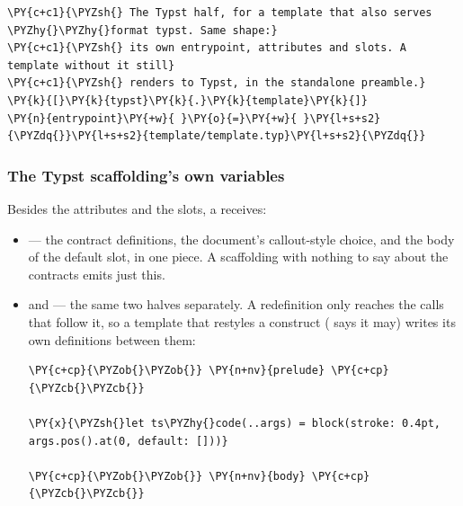 \documentclass[a4paper,twoside]{article}
\begin{document}
\begin{tscode}[lang=toml, engine=pygments]
\begin{Verbatim}[commandchars=\\\{\},breaklines, breakanywhere, commandchars=\\\{\}]
\PY{c+c1}{\PYZsh{} The Typst half, for a template that also serves \PYZhy{}\PYZhy{}format typst. Same shape:}
\PY{c+c1}{\PYZsh{} its own entrypoint, attributes and slots. A template without it still}
\PY{c+c1}{\PYZsh{} renders to Typst, in the standalone preamble.}
\PY{k}{[}\PY{k}{typst}\PY{k}{.}\PY{k}{template}\PY{k}{]}
\PY{n}{entrypoint}\PY{+w}{ }\PY{o}{=}\PY{+w}{ }\PY{l+s+s2}{\PYZdq{}}\PY{l+s+s2}{template/template.typ}\PY{l+s+s2}{\PYZdq{}}
\end{Verbatim}
\end{tscode}
\subsubsection{The Typst scaffolding's own variables}
Besides the attributes and the slots, a  receives:
\begin{itemize}
\item {} --- the  contract definitions, the document's
callout-style choice, and the body of the default slot, in one piece. A
scaffolding with nothing to say about the contracts emits just this.
\item {} and  --- the same two halves separately. A 
redefinition only reaches the calls that follow it, so a template that
restyles a construct ( says it may) writes its own definitions
between them:
\begin{tscode}[lang=jinja, engine=pygments]
\begin{Verbatim}[commandchars=\\\{\},breaklines, breakanywhere, commandchars=\\\{\}]
\PY{c+cp}{\PYZob{}\PYZob{}} \PY{n+nv}{prelude} \PY{c+cp}{\PYZcb{}\PYZcb{}}

\PY{x}{\PYZsh{}let ts\PYZhy{}code(..args) = block(stroke: 0.4pt, args.pos().at(0, default: []))}

\PY{c+cp}{\PYZob{}\PYZob{}} \PY{n+nv}{body} \PY{c+cp}{\PYZcb{}\PYZcb{}}
\end{Verbatim}
\end{tscode}
\end{itemize}
\end{document}

